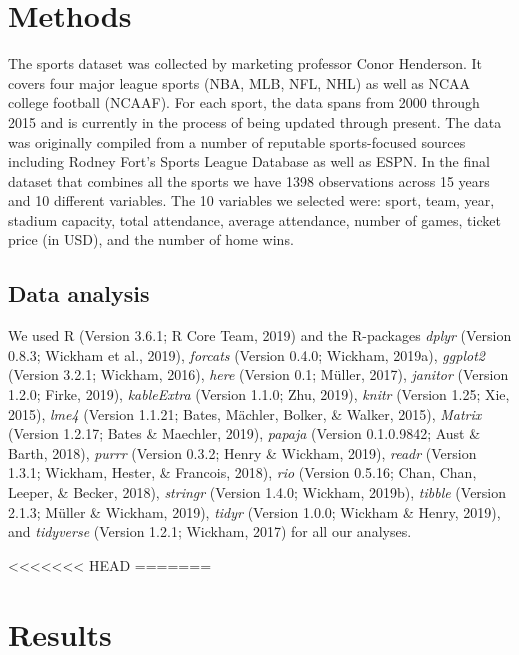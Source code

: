 \documentclass[man, fleqn, noextraspace,floatsintext]{apa6}
\begin{document}
\hypertarget{methods}{%
\section{Methods}\label{methods}}

The sports dataset was collected by marketing professor Conor Henderson. It covers four major league sports (NBA, MLB, NFL, NHL) as well as NCAA college football (NCAAF). For each sport, the data spans from 2000 through 2015 and is currently in the process of being updated through present. The data was originally compiled from a number of reputable sports-focused sources including Rodney Fort's Sports League Database as well as ESPN.
In the final dataset that combines all the sports we have 1398 observations across 15 years and 10 different variables. The 10 variables we selected were: sport, team, year, stadium capacity, total attendance, average attendance, number of games, ticket price (in USD), and the number of home wins.

\hypertarget{data-analysis}{%
\subsection{Data analysis}\label{data-analysis}}

We used R (Version 3.6.1; R Core Team, 2019) and the R-packages \emph{dplyr} (Version 0.8.3; Wickham et al., 2019), \emph{forcats} (Version 0.4.0; Wickham, 2019a), \emph{ggplot2} (Version 3.2.1; Wickham, 2016), \emph{here} (Version 0.1; Müller, 2017), \emph{janitor} (Version 1.2.0; Firke, 2019), \emph{kableExtra} (Version 1.1.0; Zhu, 2019), \emph{knitr} (Version 1.25; Xie, 2015), \emph{lme4} (Version 1.1.21; Bates, Mächler, Bolker, \& Walker, 2015), \emph{Matrix} (Version 1.2.17; Bates \& Maechler, 2019), \emph{papaja} (Version 0.1.0.9842; Aust \& Barth, 2018), \emph{purrr} (Version 0.3.2; Henry \& Wickham, 2019), \emph{readr} (Version 1.3.1; Wickham, Hester, \& Francois, 2018), \emph{rio} (Version 0.5.16; Chan, Chan, Leeper, \& Becker, 2018), \emph{stringr} (Version 1.4.0; Wickham, 2019b), \emph{tibble} (Version 2.1.3; Müller \& Wickham, 2019), \emph{tidyr} (Version 1.0.0; Wickham \& Henry, 2019), and \emph{tidyverse} (Version 1.2.1; Wickham, 2017) for all our analyses.

<<<<<<< HEAD
=======
\hypertarget{results}{%
\section{Results}\label{results}}
\end{document}
